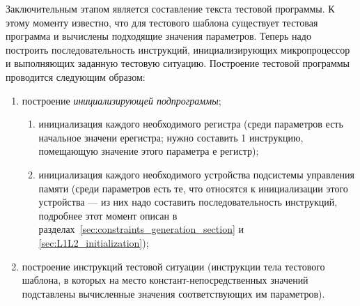 Заключительным этапом является составление текста тестовой программы.  К этому моменту известно, что для тестового шаблона существует тестовая программа и вычислены подходящие значения параметров. Теперь надо построить последовательность инструкций, инициализирующих микропроцессор и выполняющих заданную тестовую ситуацию. Построение тестовой программы проводится следующим образом:
\begin{enumerate}
  \item построение \emph{инициализирующей подпрограммы};
        \begin{enumerate}
          \item инициализация каждого необходимого регистра (среди параметров есть начальное значени ерегистра; нужно составить 1 инструкцию, помещающую значение этого параметра е регистр);
          \item инициализация каждого необходимого устройства подсистемы управления памяти (среди параметров есть те, что относятся к инициализации этого устройства --- из них надо составить последовательность инструкций, подробнее этот момент описан в разделах~\ref{sec:constraints_generation_section} и \ref{sec:L1L2_initialization});
        \end{enumerate}
  \item построение инструкций тестовой ситуации (инструкции тела тестового шаблона, в которых на место констант-непосредственных значений подставлены вычисленные значения соответствующих им параметров).
\end{enumerate}


